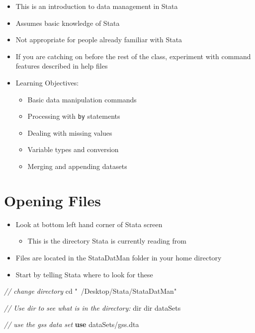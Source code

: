 \documentclass[
]{book}
\newenvironment{Shaded}{\begin{snugshade}}{\end{snugshade}}
\newcommand{\CommentTok}[1]{\textcolor[rgb]{0.56,0.35,0.01}{\textit{#1}}}
\newcommand{\KeywordTok}[1]{\textcolor[rgb]{0.13,0.29,0.53}{\textbf{#1}}}
\newcommand{\NormalTok}[1]{#1}
\newcommand{\OtherTok}[1]{\textcolor[rgb]{0.56,0.35,0.01}{#1}}
\newcommand{\StringTok}[1]{\textcolor[rgb]{0.31,0.60,0.02}{#1}}
\providecommand{\tightlist}{%
  \setlength{\itemsep}{0pt}\setlength{\parskip}{0pt}}
\begin{document}
\begin{itemize}
\tightlist
\item
  This is an introduction to data management in Stata
\item
  Assumes basic knowledge of Stata
\item
  Not appropriate for people already familiar with Stata
\item
  If you are catching on before the rest of the class, experiment with command features described in help files
\item
  Learning Objectives:

  \begin{itemize}
  \tightlist
  \item
    Basic data manipulation commands
  \item
    Processing with \texttt{by} statements
  \item
    Dealing with missing values
  \item
    Variable types and conversion
  \item
    Merging and appending datasets
  \end{itemize}
\end{itemize}

\hypertarget{opening-files}{%
\section{Opening Files}\label{opening-files}}

\begin{itemize}
\tightlist
\item
  Look at bottom left hand corner of Stata screen

  \begin{itemize}
  \tightlist
  \item
    This is the directory Stata is currently reading from
  \end{itemize}
\item
  Files are located in the StataDatMan folder in your home directory
\item
  Start by telling Stata where to look for these
\end{itemize}

\begin{Shaded}
\begin{Highlighting}[]
  \CommentTok{// change directory}
\NormalTok{  cd }\StringTok{"~/Desktop/Stata/StataDatMan"}

  \CommentTok{// Use dir to see what is in the directory:}
  \OtherTok{dir}
  \OtherTok{dir}\NormalTok{ dataSets}

  \CommentTok{// use the gss data set}
  \KeywordTok{use}\NormalTok{ dataSets/gss.dta}
\end{Highlighting}
\end{Shaded}
\end{document}
